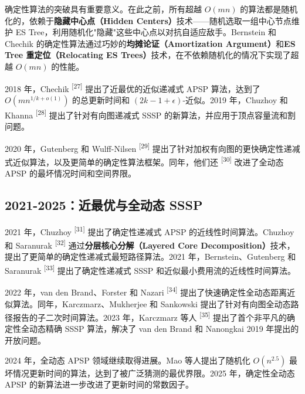 \documentclass[12pt,a4paper]{ctexart}
\begin{document}
确定性算法的突破具有重要意义。在此之前，所有超越 $O(mn)$ 的算法都是随机化的，依赖于\textbf{隐藏中心点（Hidden Centers）}技术——随机选取一组中心节点维护 ES Tree，利用随机化"隐藏"这些中心点以对抗自适应敌手。Bernstein 和 Chechik 的确定性算法通过巧妙的\textbf{均摊论证（Amortization Argument）}和\textbf{ES Tree 重定位（Relocating ES Trees）}技术，在不依赖随机化的情况下实现了超越 $O(mn)$ 的性能。

2018 年，Chechik \textsuperscript{[27]}  提出了近最优的近似递减式 APSP 算法，达到了 $O(mn^{1/k+o(1)})$ 的总更新时间和 $(2k-1+\epsilon)$-近似。2019 年，Chuzhoy 和 Khanna \textsuperscript{[28]}  提出了针对有向图递减式 SSSP 的新算法，并应用于顶点容量流和割问题。

2020 年，Gutenberg 和 Wulff-Nilsen \textsuperscript{[29]}  提出了针对加权有向图的更快确定性递减式近似算法，以及更简单的确定性算法框架。同年，他们还 \textsuperscript{[30]}  改进了全动态 APSP 的最坏情况时间和空间界限。

\subsection{2021-2025：近最优与全动态 SSSP}

2021 年，Chuzhoy \textsuperscript{[31]}  提出了确定性递减式 APSP 的近线性时间算法。Chuzhoy 和 Saranurak \textsuperscript{[32]}  通过\textbf{分层核心分解（Layered Core Decomposition）}技术，提出了更简单的确定性递减式最短路径算法。2021 年，Bernstein、Gutenberg 和 Saranurak \textsuperscript{[33]}  提出了确定性递减式 SSSP 和近似最小费用流的近线性时间算法。

2022 年，van den Brand、Forster 和 Nazari \textsuperscript{[34]}  提出了快速确定性全动态距离近似算法。同年，Karczmarz、Mukherjee 和 Sankowski 提出了针对有向图全动态路径报告的子二次时间算法。2023 年，Karczmarz 等人 \textsuperscript{[35]}  提出了首个非平凡的确定性全动态精确 SSSP 算法，解决了 van den Brand 和 Nanongkai 2019 年提出的开放问题。

2024 年，全动态 APSP 领域继续取得进展。Mao 等人提出了随机化 $O(n^{2.5})$ 最坏情况更新时间的算法，达到了被广泛猜测的最优界限。2025 年，确定性全动态 APSP 的新算法进一步改进了更新时间的常数因子。
\end{document}
